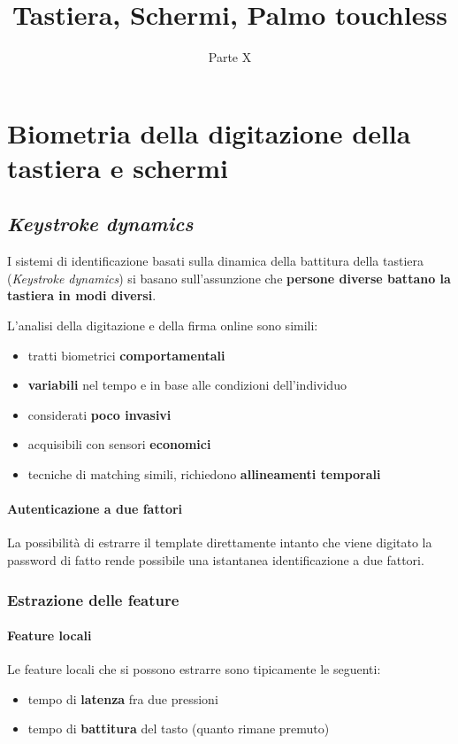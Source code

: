 \documentclass{report}
\title{Tastiera, Schermi, Palmo touchless}
\date{Parte X}
\begin{document}
\maketitle

\tableofcontents
\newpage

\chapter{Biometria della digitazione
della tastiera e schermi}

\section{\textit{Keystroke dynamics}}

I sistemi di identificazione basati sulla dinamica della battitura della tastiera 
(\textit{Keystroke dynamics}) si basano sull'assunzione che \textbf{persone 
diverse battano la tastiera in modi diversi}.

L'analisi della digitazione e della firma online sono simili:
\begin{itemize}
    \item tratti biometrici \textbf{comportamentali}
    \item \textbf{variabili} nel tempo e in base alle condizioni dell'individuo
    \item considerati \textbf{poco invasivi}
    \item acquisibili con sensori \textbf{economici}
    \item tecniche di matching simili, richiedono \textbf{allineamenti temporali} 
\end{itemize}

\subsubsection{Autenticazione a due fattori}
La possibilità di estrarre il template direttamente intanto 
che viene digitato la password di fatto rende possibile 
una istantanea identificazione a due fattori.

\subsection{Estrazione delle feature}
\subsubsection{Feature locali}
Le feature locali che si possono estrarre sono tipicamente
le seguenti:
\begin{itemize}
    \item tempo di \textbf{latenza} fra due pressioni
    \item tempo di \textbf{battitura} del tasto (quanto rimane premuto)
\end{itemize}
\end{document}
